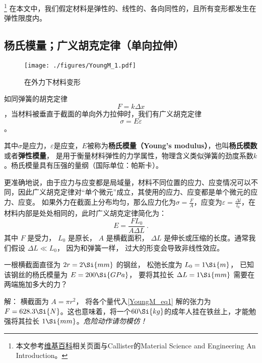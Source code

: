 
\begin{issues}
\issueDraft
\end{issues}

\footnote{本文参考\href{https://en.wikipedia.org/wiki/Young's_modulus}{维基百科}相关页面与Callister的Material Science and Engineering An Introduction。}
在本文中，我们假定材料是弹性的、线性的、各向同性的，且所有变形都发生在弹性限度内。

\subsection{杨氏模量；广义胡克定律（单向拉伸）}
\begin{figure}[ht]
\centering
\texttt{[image: ./figures/YoungM\_1.pdf]}
\caption{在外力下材料变形} \label{YoungM_fig1}
\end{figure}

如同弹簧的胡克定律$$F=k \Delta x$$，当材料被垂直于截面的单向外力拉伸时，我们有广义胡克定律
\begin{equation}
\sigma = E \varepsilon
\end{equation}。

其中$\sigma$是应力，$\varepsilon$是应变，$E$被称为\textbf{杨氏模量（Young's modulus）}，也叫\textbf{杨氏模数}或者\textbf{弹性模量}， 是用于衡量材料弹性的力学属性，物理含义类似弹簧的劲度系数$k$。杨氏模量具有压强的量纲（国际单位：帕斯卡）。

更准确地说，由于应力与应变都是局域量，材料不同位置的应力、应变情况可以不同，因此广义胡克定律对“单个微元”成立，其使用的应力、应变都是单个微元的应力、应变。%
如果外力在截面上分布均匀，那么应力化为$\sigma=\frac{F}{A}$，应变为$\varepsilon=\frac{\Delta l}{l_0}$，在材料内部是处处相同的，此时广义胡克定律简化为：%
\begin{equation}\label{YoungM_eq1}
E = \frac{FL_0}{A\Delta L}~.
\end{equation}
其中 $F$ 是受力， $L_0$ 是原长， $A$ 是横截面积， $\Delta L$ 是伸长或压缩的长度。通常我们假设 $\Delta L \ll L_0$， 因为和弹簧一样， 过大的形变会导致非线性效应。

\begin{example}{}
一根横截面直径为 $2r = 2\Si{mm}$ 的钢丝， 松弛长度为 $L_0 = 1\Si{m}$， 已知该钢丝的杨氏模量为 $E = 200\Si{GPa}$， 要将其拉长 $\Delta L = 1\Si{mm}$ 需要在两端施加多大的力？

解： 横截面为 $A = \pi r^2$， 将各个量代入\autoref{YoungM_eq1} 解的张力为 $F = 628.3\Si{N}$。这也意味着，将一个$60 \Si{kg}$的成年人挂在铁丝上，才能勉强将其拉长 $1\Si{mm}$。\textsl{危险动作请勿模仿！}
\end{example}

